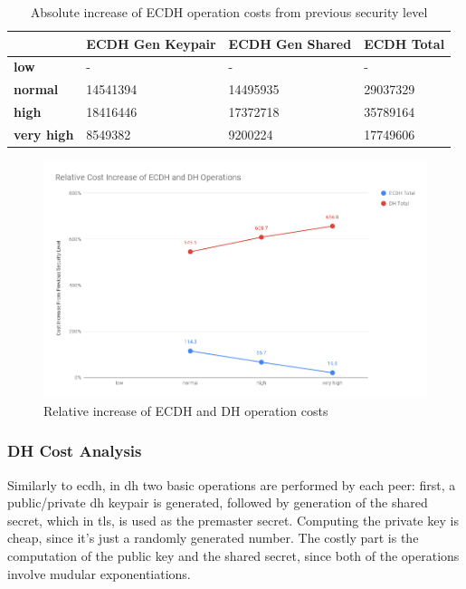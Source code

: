 \documentclass{llncs}
\begin{document}
\begin{table}[]
\begin{tabular}{|l|l|l|l|}
\hline
                   & \textbf{ECDH Gen Keypair} & \textbf{ECDH Gen Shared} & \textbf{ECDH Total} \\ \hline
\textbf{low}       & -                         & -                        & -                   \\ \hline
\textbf{normal}    & 14541394                  & 14495935                 & 29037329            \\ \hline
\textbf{high}      & 18416446                  & 17372718                 & 35789164            \\ \hline
\textbf{very high} & 8549382                   & 9200224                  & 17749606            \\ \hline
\end{tabular}
\caption{\label{table:ecdh-absolute-cost-increase} Absolute increase of ECDH operation costs from previous security level}
\end{table}

  \begin{figure}
    \centering
    \includegraphics[width=1.0\textwidth]{img/ecdh_dh_relative_cost_increase.png}
    \caption{\label{fig:ecdh-dh-relative-cost-increase} Relative increase of ECDH and DH operation costs}
  \end{figure}

\subsubsection{DH Cost Analysis}

Similarly to \gls{ecdh}, in \gls{dh} two basic operations are performed by each peer: first, a public/private \gls{dh} keypair is generated, followed
by generation of the shared secret, which in \gls{tls}, is used as the premaster secret. Computing the private key is cheap, since it's just a randomly 
generated number. The costly part is the computation of the public key and the shared secret, since both of the operations involve mudular exponentiations.
\end{document}
